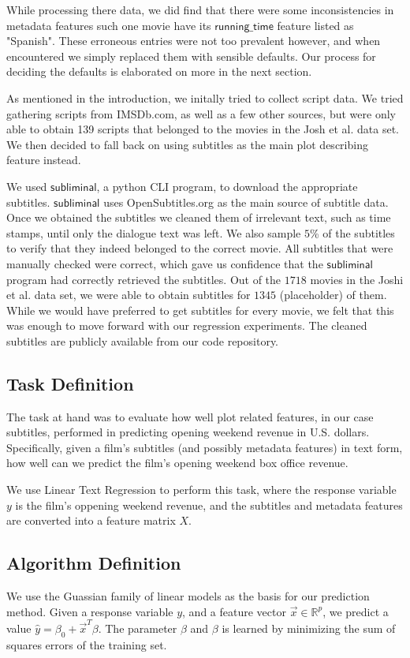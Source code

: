 \documentclass[11pt]{article}
\begin{document}
While processing there data, we 
did find that there were some inconsistencies in metadata features such one movie
have its $\mathsf{running\_time}$ feature listed as "Spanish". These erroneous entries
were not too prevalent however, and when encountered we simply replaced them with
sensible defaults. Our process for deciding the defaults is elaborated on more in the
next section.

As mentioned in the introduction, we initally tried to collect script data. We tried
gathering scripts from IMSDb.com, as well as a few other sources, but were only able
to obtain 139 scripts that belonged to the movies in the Josh et al. data set. We then
decided to fall back on using subtitles as the main plot describing feature instead.

We used $\mathsf{subliminal}$, a python CLI program, to download the appropriate
subtitles. $\mathsf{subliminal}$ uses OpenSubtitles.org as the main source of subtitle
data. Once we obtained the subtitles we cleaned them of irrelevant text, such as time
stamps, until only the dialogue text was left. We also sample $5$\% of the subtitles to
verify that they indeed belonged to the correct movie. All subtitles that were manually
checked were correct, which gave us confidence that the $\mathsf{subliminal}$ program
had correctly retrieved the subtitles. Out of the $1718$ movies in the Joshi
et al. data set, we were able to obtain subtitles for $1345$ (placeholder) of them.
While we would have preferred to get subtitles for every movie, we felt that this was
enough to move forward with our regression experiments. The cleaned subtitles are
publicly available from our code repository.

\subsection{Task Definition}
The task at hand was to evaluate how well plot related features, in our case subtitles,
performed in predicting opening weekend revenue in U.S. dollars. Specifically, given
a film's subtitles (and possibly metadata features) in text form, how well can we
predict the film's opening weekend box office revenue.

We use Linear Text Regression to perform this task, where the response variable $y$ is
the film's oppening weekend revenue, and the subtitles and metadata features are
converted into a feature matrix $X$.

\subsection{Algorithm Definition}
We use the Guassian family of linear models as the basis for our prediction method.
Given a response variable $y$, and a feature vector $\vec{x} \in \mathbb{R}^p$, we
predict a value $\hat{y} = \beta_0 + \vec{x}^T \beta$. The parameter $\beta$ and $\beta$
is learned by minimizing the sum of squares errors of the training set.
\end{document}
